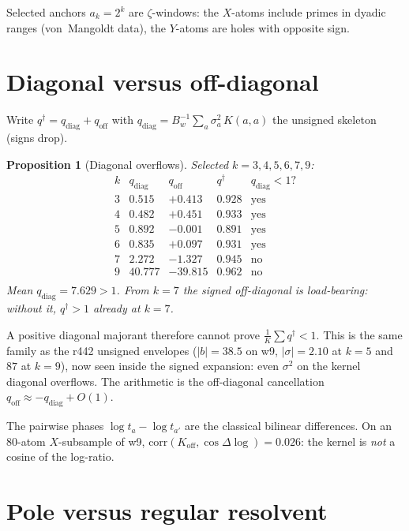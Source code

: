 \documentclass[11pt]{article}
\newtheorem{prop}{Proposition}
\theoremstyle{remark}
\newcommand{\qd}{q^{\dagger}}
\begin{document}
Selected anchors $a_k=2^k$ are $\zeta$-windows: the
$X$-atoms include primes in dyadic ranges (von~Mangoldt
data), the $Y$-atoms are holes with opposite sign.

\section{Diagonal versus off-diagonal}\label{sec:diag}

Write $\qd=q_{\mathrm{diag}}+q_{\mathrm{off}}$ with
$q_{\mathrm{diag}}=B_w^{-1}\sum_a\sigma_a^{2}\,K(a,a)$
the unsigned skeleton (signs drop).

\begin{prop}[Diagonal overflows]\label{prop:diag}
Selected $k=3,4,5,6,7,9$:
\[
\begin{array}{crrrr}
k&q_{\mathrm{diag}}&q_{\mathrm{off}}&\qd&q_{\mathrm{diag}}<1?\\
3&0.515&+0.413&0.928&\mathrm{yes}\\
4&0.482&+0.451&0.933&\mathrm{yes}\\
5&0.892&-0.001&0.891&\mathrm{yes}\\
6&0.835&+0.097&0.931&\mathrm{yes}\\
7&2.272&-1.327&0.945&\mathrm{no}\\
9&40.777&-39.815&0.962&\mathrm{no}\\
\end{array}
\]
Mean $q_{\mathrm{diag}}=7.629>1$.
From $k=7$ the signed off-diagonal is load-bearing:
without it, $\qd>1$ already at $k=7$.
\end{prop}

A positive diagonal majorant therefore cannot prove
$\frac1K\sum\qd<1$.  This is the same family as the r442
unsigned envelopes ($|b|=38.5$ on w9, $|\sigma|=2.10$ at
$k=5$ and $87$ at $k=9$), now seen inside the signed
expansion: even $\sigma^{2}$ on the kernel diagonal
overflows.  The arithmetic is the off-diagonal
cancellation $q_{\mathrm{off}}\approx -q_{\mathrm{diag}}+O(1)$.

The pairwise phases $\log t_a-\log t_{a'}$ are the
classical bilinear differences.  On an $80$-atom
$X$-subsample of w9,
$\mathrm{corr}(K_{\mathrm{off}},\cos\Delta\log)=0.026$:
the kernel is \emph{not} a cosine of the log-ratio.

\section{Pole versus regular resolvent}\label{sec:pole}
\end{document}
